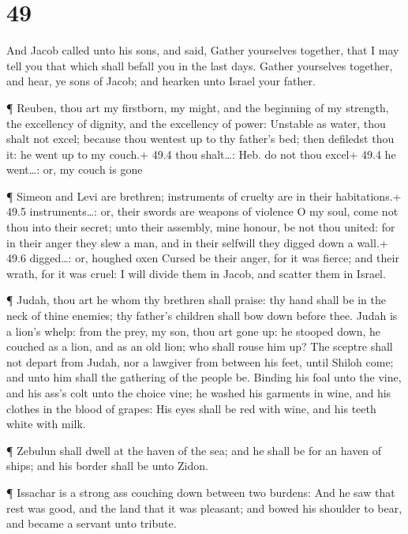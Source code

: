 \hypertarget{section-48}{%
\section{49}\label{section-48}}

 And Jacob called unto his sons, and said, Gather yourselves
together, that I may tell you that which shall befall you in the last
days.  Gather yourselves together, and hear, ye sons of
Jacob; and hearken unto Israel your father.

 ¶ Reuben, thou art my firstborn, my might, and the
beginning of my strength, the excellency of dignity, and the excellency
of power:  Unstable as water, thou shalt not excel; because
thou wentest up to thy father's bed; then defiledst thou it: he went up
to my couch.+ 49.4 thou shalt\ldots: Heb. do not thou excel+ 49.4 he
went\ldots: or, my couch is gone

 ¶ Simeon and Levi are brethren; instruments of cruelty are
in their habitations.+ 49.5 instruments\ldots: or, their swords are
weapons of violence  O my soul, come not thou into their
secret; unto their assembly, mine honour, be not thou united: for in
their anger they slew a man, and in their selfwill they digged down a
wall.+ 49.6 digged\ldots: or, houghed oxen  Cursed be their
anger, for it was fierce; and their wrath, for it was cruel: I will
divide them in Jacob, and scatter them in Israel.

 ¶ Judah, thou art he whom thy brethren shall praise: thy
hand shall be in the neck of thine enemies; thy father's children shall
bow down before thee.  Judah is a lion's whelp: from the
prey, my son, thou art gone up: he stooped down, he couched as a lion,
and as an old lion; who shall rouse him up?  The sceptre
shall not depart from Judah, nor a lawgiver from between his feet, until
Shiloh come; and unto him shall the gathering of the people be.
 Binding his foal unto the vine, and his ass's colt unto
the choice vine; he washed his garments in wine, and his clothes in the
blood of grapes:  His eyes shall be red with wine, and his
teeth white with milk.

 ¶ Zebulun shall dwell at the haven of the sea; and he
shall be for an haven of ships; and his border shall be unto Zidon.

 ¶ Issachar is a strong ass couching down between two
burdens:  And he saw that rest was good, and the land that
it was pleasant; and bowed his shoulder to bear, and became a servant
unto tribute.

